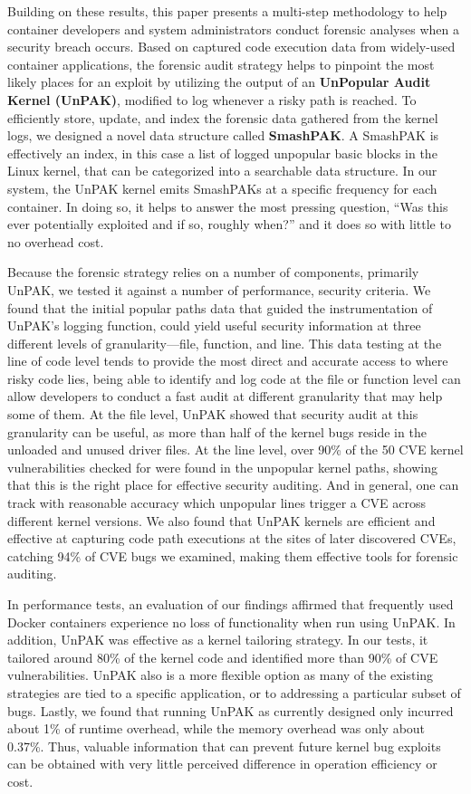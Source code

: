 Building on these results, this paper presents a multi-step methodology to help container developers and system administrators conduct forensic analyses when a security breach occurs. 
Based on captured code execution data from widely-used container applications, 
the forensic audit strategy helps to pinpoint the most likely places for an exploit by utilizing the output of an \textbf{UnPopular Audit Kernel (UnPAK)}, modified to log whenever a risky path is reached. 
To efficiently store, update, and index the forensic data gathered from the kernel logs, we designed a novel data structure called \textbf{SmashPAK}. 
A SmashPAK is effectively an index, in this case a list of logged unpopular basic blocks in the Linux kernel, that can be categorized into a searchable data structure. In our system, 
the UnPAK kernel emits SmashPAKs  at a specific frequency for each container. In doing so, it helps to answer the most pressing question, 
``Was this ever potentially exploited and if so, roughly when?'' and it does so with little to no overhead cost. 

Because the forensic strategy relies on a number of components, primarily UnPAK, we tested it against a number of performance, security criteria. 
We found that the initial popular paths data that guided the instrumentation of UnPAK’s logging function, could yield useful security information at three different levels of granularity—file, function, 
and line. This data testing at the line of code level tends to provide the most direct and accurate access to where risky code lies, being able to identify and log code at the file or function level can 
allow developers to conduct a fast audit at different granularity that may help some of them. At the file level, UnPAK showed that security audit at this granularity can be useful, 
as more than half of the kernel bugs reside in the unloaded and unused driver files. At the line level, over 90\% of the 50 CVE kernel vulnerabilities checked for were found in the unpopular kernel paths, 
showing that this is the right place for effective security auditing. And in general, one can track with reasonable accuracy which unpopular lines trigger a CVE across different kernel versions. 
We also found that UnPAK kernels are efficient and effective at capturing code path executions at the sites of later discovered CVEs, catching 94\% of CVE bugs we examined, 
making them effective tools for forensic auditing.

In performance tests, an evaluation of our findings affirmed that frequently used Docker containers experience no loss of functionality when run using UnPAK. 
In addition, UnPAK was effective as a kernel tailoring strategy. In our tests, it tailored around 80\% of the kernel code and identified more than 90\% of CVE vulnerabilities. 
UnPAK also is a more flexible option as many of the existing strategies are tied to a specific application, or to addressing a particular subset of bugs. 
Lastly, we found that running UnPAK as currently designed only incurred about 1\% of runtime overhead, while the memory overhead was only about 0.37\%. 
Thus, valuable information that can prevent future kernel bug exploits can be obtained with very little perceived difference in operation efficiency or cost.

